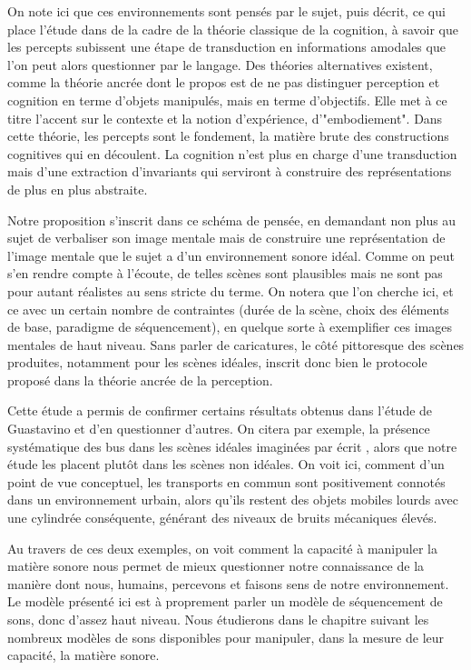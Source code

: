  On note ici que ces environnements sont pensés par le sujet, puis décrit, ce qui place l'étude dans de la cadre de la théorie classique de la cognition, à savoir que les percepts subissent une étape de transduction en informations amodales que l'on peut alors questionner par le langage. Des théories alternatives existent, comme la théorie ancrée\cite{barsalou2010grounded} dont le propos est de ne pas distinguer perception et cognition en terme d'objets manipulés, mais en terme d'objectifs. Elle met à ce titre l'accent sur le contexte et la notion d'expérience, d'"embodiement". Dans cette théorie, les percepts sont le fondement, la matière brute des constructions cognitives qui en découlent. La cognition n'est plus en charge d'une transduction mais d'une extraction d'invariants qui serviront à construire des représentations de plus en plus abstraite.

  Notre proposition s'inscrit dans ce schéma de pensée, en demandant non plus au sujet de verbaliser son image mentale mais de \og construire \fg une représentation de l'image mentale que le sujet a d'un environnement sonore idéal. Comme on peut s'en rendre compte à l'écoute, de telles scènes sont plausibles mais ne sont pas pour autant réalistes au sens stricte du terme. On notera que l'on cherche ici, et ce avec un certain nombre de contraintes (durée de la scène, choix des éléments de base, paradigme de séquencement), en quelque sorte à exemplifier ces images mentales de haut niveau. Sans parler de caricatures, le côté pittoresque des scènes produites, notamment pour les scènes idéales, inscrit donc bien le protocole proposé dans la théorie ancrée de la perception.

  Cette étude a permis de confirmer certains résultats obtenus dans l'étude de Guastavino\cite{guastavino2006ideal} et d'en questionner d'autres. On citera par exemple, la présence systématique des bus dans les scènes idéales imaginées \og par écrit \fg, alors que notre étude les placent plutôt dans les scènes non idéales. On voit ici, comment d'un point de vue conceptuel, les transports en commun sont positivement connotés dans un environnement urbain, alors qu'ils restent des objets mobiles lourds avec une cylindrée conséquente, générant des niveaux de bruits mécaniques élevés\cite{lafayhal-01300399}.

  Au travers de ces deux exemples, on voit comment la capacité à manipuler la matière sonore nous permet de mieux questionner notre connaissance de la manière dont nous, humains, percevons et faisons sens de notre environnement. Le modèle présenté ici est à proprement parler un modèle de séquencement de sons, donc d'assez haut niveau. Nous étudierons dans le chapitre suivant les nombreux modèles de sons disponibles pour manipuler, dans la mesure de leur capacité, la matière sonore. %


